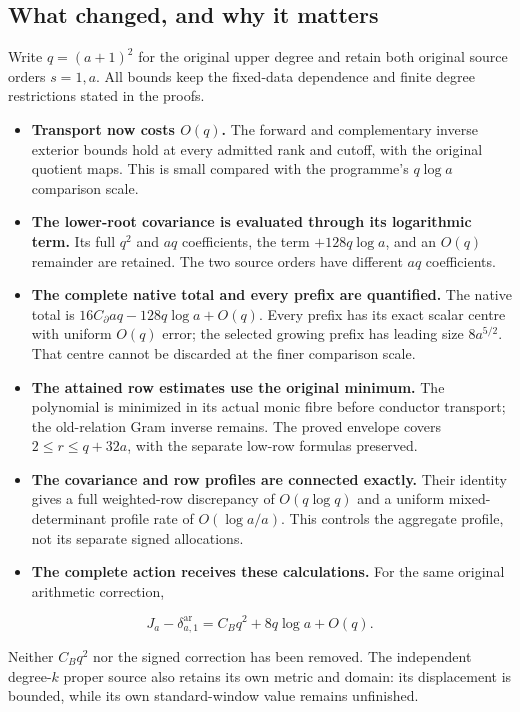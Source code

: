 \documentclass[
]{article}
\providecommand{\tightlist}{%
  \setlength{\itemsep}{0pt}\setlength{\parskip}{0pt}}
\begin{document}
\subsection{What changed, and why it
matters}\label{what-changed-and-why-it-matters-1}

Write \(q=(a+1)^2\) for the original upper degree and retain both
original source orders \(s=1,a\). All bounds keep the fixed-data
dependence and finite degree restrictions stated in the proofs.

\begin{itemize}
\tightlist
\item
  \textbf{Transport now costs \(O(q)\).} The forward and complementary
  inverse exterior bounds hold at every admitted rank and cutoff, with
  the original quotient maps. This is small compared with the
  programme's \(q\log a\) comparison scale.
\item
  \textbf{The lower-root covariance is evaluated through its logarithmic
  term.} Its full \(q^2\) and \(aq\) coefficients, the term
  \(+128q\log a\), and an \(O(q)\) remainder are retained. The two
  source orders have different \(aq\) coefficients.
\item
  \textbf{The complete native total and every prefix are quantified.}
  The native total is \(16C_{\partial}aq-128q\log a+O(q)\). Every prefix
  has its exact scalar centre with uniform \(O(q)\) error; the selected
  growing prefix has leading size \(8a^{5/2}\). That centre cannot be
  discarded at the finer comparison scale.
\item
  \textbf{The attained row estimates use the original minimum.} The
  polynomial is minimized in its actual monic fibre before conductor
  transport; the old-relation Gram inverse remains. The proved envelope
  covers \(2\le r\le q+32a\), with the separate low-row formulas
  preserved.
\item
  \textbf{The covariance and row profiles are connected exactly.} Their
  identity gives a full weighted-row discrepancy of \(O(q\log q)\) and a
  uniform mixed-determinant profile rate of \(O(\log a/a)\). This
  controls the aggregate profile, not its separate signed allocations.
\item
  \textbf{The complete action receives these calculations.} For the same
  original arithmetic correction,
\end{itemize}

\[
J_a-\delta^{\mathrm{ar}}_{a,1}=C_Bq^2+8q\log a+O(q).
\]

Neither \(C_Bq^2\) nor the signed correction has been removed. The
independent degree-\(k\) proper source also retains its own metric and
domain: its displacement is bounded, while its own standard-window value
remains unfinished.
\end{document}
